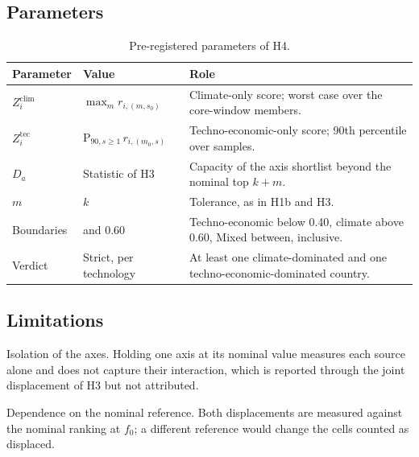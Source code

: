 \subsection{Parameters}
\label{subsec:h4_parameters}

\begin{table}[htbp]
    \centering
    \caption{Pre-registered parameters of H4.}
    \label{tab:h4_parameters}
    \small
    \renewcommand{\arraystretch}{1.2}
    \begin{tabularx}{\textwidth}{
        @{}
        >{\raggedright\arraybackslash}p{2.6cm}
        >{\raggedright\arraybackslash}p{3.0cm}
        >{\raggedright\arraybackslash}X
        @{}
    }
        \toprule
        \textbf{Parameter} & \textbf{Value} & \textbf{Role} \\
        \midrule
        $Z^{\mathrm{clim}}_i$ & $\max_m r_{i,(m,s_0)}$ & Climate-only score;
        worst case over the core-window members. \\
        \addlinespace
        $Z^{\mathrm{tec}}_i$ & $\mathrm{P}_{90,s\geq1}\,r_{i,(m_0,s)}$ &
        Techno-economic-only score; 90th percentile over samples. \\
        \addlinespace
        $D_a$ & Statistic of H3 & Capacity of the axis shortlist beyond the
        nominal top $k+m$. \\
        \addlinespace
        $m$ & $k$ & Tolerance, as in H1b and H3. \\
        \addlinespace
        Boundaries & 0.40 and 0.60 & Techno-economic below 0.40, climate above
        0.60, Mixed between, inclusive. \\
        \addlinespace
        Verdict & Strict, per technology & At least one climate-dominated and
        one techno-economic-dominated country. \\
        \bottomrule
    \end{tabularx}
\end{table}

\subsection{Limitations}
\label{subsec:h4_limitations}

Isolation of the axes. Holding one axis at its nominal value measures each
source alone and does not capture their interaction, which is reported through
the joint displacement of H3 but not attributed.

Dependence on the nominal reference. Both displacements are measured against the
nominal ranking at $f_0$; a different reference would change the cells counted
as displaced.


